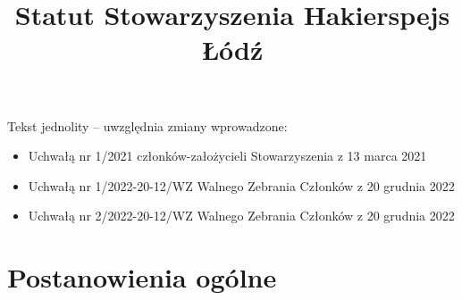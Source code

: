 \documentclass[chapterprefix,notitlepage]{article}
\begin{document}
\title{Statut Stowarzyszenia Hakierspejs Łódź}
\author{}
\date{}

\maketitle

\large Tekst jednolity – uwzględnia zmiany wprowadzone:
\begin{itemize}
\item Uchwałą nr 1/2021 członków-założycieli Stowarzyszenia z 13 marca 2021
\item Uchwałą nr 1/2022-20-12/WZ Walnego Zebrania Członków z 20 grudnia 2022
\item Uchwałą nr 2/2022-20-12/WZ Walnego Zebrania Członków z 20 grudnia 2022
\end{itemize} 

\section{Postanowienia ogólne}
\end{document}
